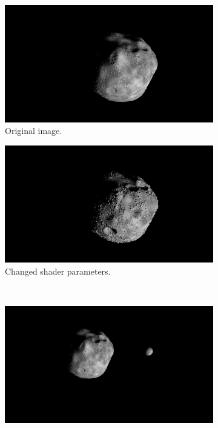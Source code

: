 \begin{figure}[htb]
    \centering
    \begin{subfigure}[b]{0.47\textwidth}
        \centering
        \includegraphics[width=\textwidth]{doc/thesis/0_figures/procedural_terrain/orig.png}
        \caption{Original image.}
        \label{fig:render_out_orig}
    \end{subfigure}
    \begin{subfigure}[b]{0.47\textwidth}
        \centering
        \includegraphics[width=\textwidth]{doc/thesis/0_figures/procedural_terrain/changed2.png}
        \caption{Changed shader parameters.}
        \label{fig:render_out_changed}
    \end{subfigure}
    \\
    \begin{subfigure}[b]{0.47\textwidth}
        \centering
        \includegraphics[width=\textwidth]{doc/thesis/0_figures/procedural_terrain/main_moon.png}

\end{subfigure}
\end{figure}
